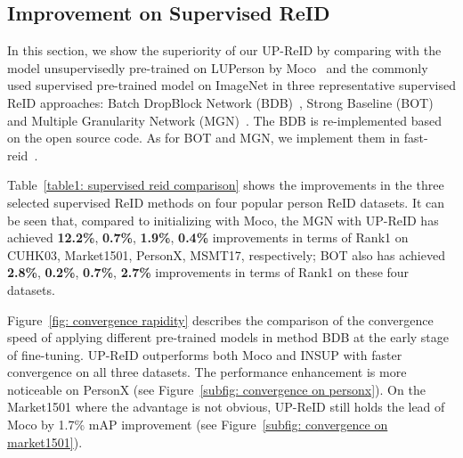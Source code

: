 \documentclass[10pt,twocolumn,letterpaper]{article}
\newcommand{\tcr}{\textcolor{red}}
\begin{document}

\subsection{Improvement on Supervised ReID}
In this section, we show the superiority of our UP-ReID by comparing with the model unsupervisedly pre-trained on LUPerson by Moco~\cite{fu2021unsupervised} and the commonly used supervised pre-trained model on ImageNet in three representative supervised ReID approaches: Batch DropBlock Network (BDB)~\cite{dai2019batch}, Strong Baseline (BOT)~\cite{luo2019bag} and Multiple Granularity Network (MGN)~\cite{wang2018learning}.
The BDB is re-implemented based on the open source code. As for BOT and MGN, we implement them in fast-reid~\cite{he2020fastreid}. 

Table~\ref{table1: supervised reid comparison} shows the improvements in the three selected supervised ReID methods on four popular person ReID datasets.
It can be seen that, compared to initializing with Moco, the MGN with UP-ReID has achieved \textbf{12.2\%}, \textbf{0.7\%}, \textbf{1.9\%}, \textbf{0.4\%} improvements in terms of Rank1 on CUHK03, Market1501, PersonX, MSMT17, respectively; BOT also has achieved \textbf{2.8\%}, \textbf{0.2\%}, \textbf{0.7\%}, \textbf{2.7\%} improvements in terms of Rank1 on these four datasets. 

Figure~\ref{fig: convergence rapidity} describes the comparison of the convergence speed of applying different pre-trained models in method BDB at the early stage of fine-tuning. UP-ReID outperforms both Moco and INSUP with faster convergence on all three datasets. The performance enhancement is more noticeable on PersonX (see Figure~\ref{subfig: convergence on personx}). On the Market1501 where the advantage is not obvious, UP-ReID still holds the lead of Moco by 1.7\% mAP improvement (see Figure~\ref{subfig: convergence on market1501}).
\end{document}
